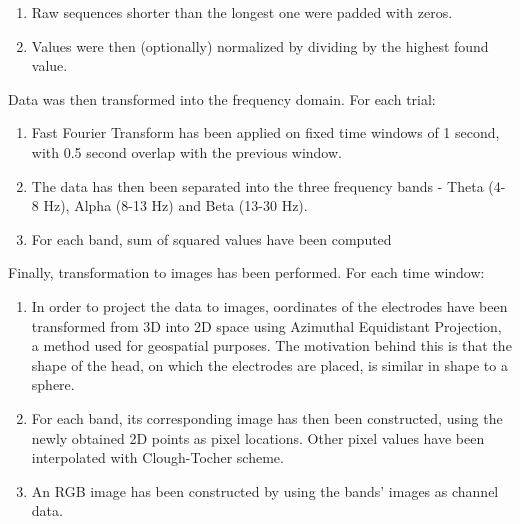 \documentclass{article}
\begin{document}
\begin{enumerate}
 \item Raw sequences shorter than the longest one were padded with zeros.
 \item Values were then (optionally) normalized by dividing by the highest found value.
\end{enumerate}
Data was then transformed into the frequency domain. For each trial:
\begin{enumerate}[resume]
 \item Fast Fourier Transform has been applied on fixed time windows of 1 second, with 0.5 second overlap 		with the previous window.
 \item The data has then been separated into the three frequency bands - Theta (4-8 Hz), Alpha (8-13 Hz) and Beta (13-30 Hz).
 \item For each band, sum of squared values have been computed
\end{enumerate}
Finally, transformation to images has been performed. For each time window:
\begin{enumerate}[resume]
 \item In order to project the data to images, oordinates of the electrodes have been transformed from 3D into 2D space using Azimuthal Equidistant Projection, a method used for geospatial purposes.
 The motivation behind this is that the shape of the head, on which the electrodes are placed, is similar in shape to a sphere.
 \item For each band, its corresponding image has then been constructed, using the newly obtained 2D points as pixel locations. Other pixel values have been interpolated with Clough-Tocher scheme.
 \item An RGB image has been constructed by using the bands' images as channel data.  
\end{enumerate}
\end{document}
